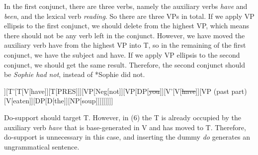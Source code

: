 \documentclass[a4paper,12pt]{article}
\begin{document}
\begin{enumerate}
\begin{enumerate}[label=(\roman*)]
      In the first conjunct, there are three verbs, namely the auxiliary verbs \textit{have} and \textit{been}, and the lexical verb \textit{reading}. So there are three VPs in total. If we apply VP ellipsis to the first conjunct, we should delete from the highest VP, which means there should not be any verb left in the conjunct. However, we have moved the auxiliary verb have from the highest VP into T, so in the remaining of the first conjunct, we have the subject and have. If we apply VP ellipsis to the second conjunct, we should get the same result. Therefore, the second conjunct should be \textit{Sophie had not}, instead of *Sophie did not.

\begin{forest}
				[TP, for tree={parent anchor=south, child anchor=north, align=center, base=bottom}
    	        [DP[you]][T'[T[V[have]][T[PRES]]][VP[Neg[not]][VP[DP[\st{you}]][V'[V[\st{have}]][VP (past part)[V[eaten]][DP[D[the]][NP[soup]]]]]]]]]
            \end{forest}

            Do-support should target T. However, in (6) the T is already occupied by the auxiliary verb \textit{have} that is base-generated in V and has moved to T. Therefore, do-support is unnecessary in this case, and inserting the dummy \textit{do} generates an ungrammatical sentence.

        \end{enumerate}

\end{enumerate}
\end{document}

